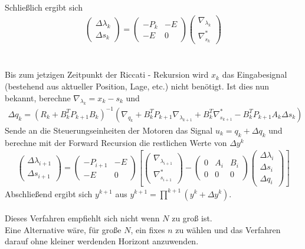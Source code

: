   Schließlich ergibt sich
  \begin{align*}
  \begin{pmatrix}
  \Delta \lambda_{k} \\
  \Delta s_{k}
  \end{pmatrix} =
  \begin{pmatrix}
  -P_k & -E \\
  -E  & 0 
  \end{pmatrix}
  \begin{pmatrix}
  \nabla_{\lambda_{k}} \\
  \nabla_{s_{k}}^{*}
  \end{pmatrix}
  \end{align*} \\
  \\
  Bis zum jetzigen Zeitpunkt der Riccati - Rekursion wird $x_k$ das Eingabesignal (bestehend aus aktueller Position, Lage, etc.) nicht benötigt. Ist dies nun bekannt, berechne $\nabla_{\lambda_{k}}=x_k -s_k $ und 
  \begin{align*}
  \Delta q_{k} =
  (R_{k}+B_{k}^{T}P_{k+1} B_{k})^{-1}
  (\nabla_{q_{k}}+ B_{k}^{T}P_{k+1} \nabla_{\lambda_{k+1}} +
  B_{k}^{T}\nabla_{s_{k+1}}^{*} -B_{k}^{T}P_{k+1} A_{k} \Delta s_{k})  
  \end{align*}
  Sende an die Steuerungseinheiten der Motoren das Signal $u_k = q_k + \Delta q_k $ und  berechne mit der Forward Recursion die restlichen Werte von $\Delta y^{k}$
  \begin{align*}
  \begin{pmatrix}
  \Delta \lambda_{i+1} \\
  \Delta s_{i+1}
  \end{pmatrix} =
  \begin{pmatrix}
  -P_{i+1} & -E \\
  -E  & 0 
  \end{pmatrix}
  \left[ 
  \begin{pmatrix}
  \nabla_{\lambda_{i+1}} \\
  \nabla_{s_{i+1}}^{*}
  \end{pmatrix} -
  \begin{pmatrix}
  0 & A_i & B_i \\
  0 & 0 & 0 
  \end{pmatrix}
  \begin{pmatrix}
  \Delta \lambda_{i} \\
  \Delta s_{i} \\
  \Delta q_{i}
  \end{pmatrix} \right] 
  \end{align*}
  Abschließend ergibt sich $y^{k+1}$ aus $ y^{k+1} = \prod ^{k+1}(y^{k} + \Delta y^{k})$.\\
  \\
  Dieses Verfahren empfiehlt sich nicht wenn $ N $ zu groß ist.\\
  Eine Alternative wäre, für große $N$, ein fixes $n$ zu wählen und das Verfahren darauf ohne kleiner werdenden Horizont anzuwenden.


